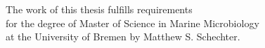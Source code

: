 \documentclass[10 pt, a4paper, twoside, openright]{Thesis}
\begin{document}
\begin{titlepage}
\begin{center}












\end{center}

\end{titlepage}

\newpage
\pagestyle{empty}


\begin{minipage}{0.3\textwidth}
\end{minipage} \hfill
\begin{minipage}{0.7\textwidth}
The work of this thesis fulfills requirements \\
for the degree of Master of Science in Marine Microbiology \\
at the University of Bremen by Matthew S. Schechter. \\
\end{minipage}
\end{document}
